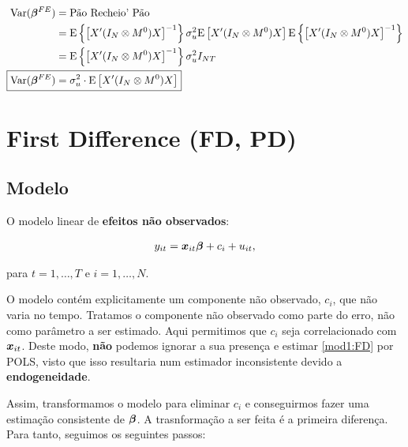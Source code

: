 \documentclass[11pt, oneside, a4paper, article]{article}
\numberwithin{equation}{section}
\begin{document}
\begin{description}
\noindent
{}

\vspace{-2 em}
\begin{align*}
\Var( \mbs{\beta}^{FE} ) &= \text{Pão Recheio' Pão} 
\\ &=
\E \left\{ \left[
X' ( I_{N} \otimes M^{0} ) X
\right]^{-1} \right\}
\sigma_{u}^{2} \E\left[ X' ( I_{N} \otimes M^{0} ) X \right]
\E \left\{ \left[
X' ( I_{N} \otimes M^{0} ) X
\right]^{-1} \right\}
\\  &=
\E \left\{ \left[
X' ( I_{N} \otimes M^{0} ) X
\right]^{-1} \right\}
\sigma_{u}^{2} I_{NT}
\\
\Aboxed{ \Var( \mbs{\beta}^{FE} ) &= \sigma_{u}^{2} \cdot  \E\left[ X' ( I_{N} \otimes M^{0} ) X \right] }
\end{align*}


\clearpage
\section{First Difference (FD, PD)}


\subsection*{Modelo}

O modelo linear de \textbf{efeitos não observados}:

\vspace{-1 em}
\begin{align} \label{mod1:FD}
	y_{it} = \boldsymbol{x}_{it} \boldsymbol{\beta} + c_{i} + u_{it},
\end{align}

\noindent
para
$t = 1, \dots, T$ e $i = 1, \dots, N$.

O modelo contém explicitamente um componente não observado, $c_{i}$, que não varia no tempo.
Tratamos o componente não observado como parte do erro, não como parâmetro a ser estimado.
Aqui permitimos que $c_{i}$ seja correlacionado com $\boldsymbol{x}_{it}$.
Deste modo, \textbf{não} podemos ignorar a sua presença e estimar \eqref{mod1:FD} por POLS, visto que isso resultaria num estimador inconsistente devido a \textbf{endogeneidade}.

Assim, transformamos o modelo para eliminar $c_{i}$ e conseguirmos fazer uma estimação consistente de $\boldsymbol{\beta}$.
A trasnformação a ser feita é a primeira diferença.
Para tanto, seguimos os seguintes passos:


\end{description}
\end{document}
